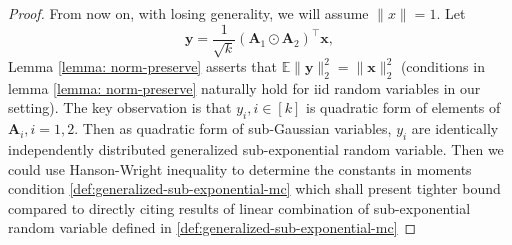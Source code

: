 \begin{proof}
	From now on, with losing generality, we will assume $\|x\|=1$.  Let 
	\begin{equation}
	\mathbf{y}= \frac{1}{\sqrt{k}}(\mathbf{A}_1 \odot \mathbf{A}_2)^\top \mathbf{x}, \nonumber
	\end{equation}
	Lemma \ref{lemma: norm-preserve} asserts that $\mathbb{E}\|\mathbf{y}\|^2_2= \|\mathbf{x}\|^2_2$ (conditions in lemma \ref{lemma: norm-preserve} naturally hold for iid random variables in our setting). The key observation is that $y_i, i\in [k]$ is quadratic form of elements of $\mathbf{A}_i, i=1,2$. Then as quadratic form of sub-Gaussian variables, $y_i$ are identically independently distributed generalized sub-exponential random variable. Then we could use Hanson-Wright inequality to determine the constants in moments condition \ref{def:generalized-sub-exponential-mc} which shall present tighter bound compared to directly citing results of linear combination of sub-exponential random variable defined in \eqref{def:generalized-sub-exponential-mc}
	

\end{proof}
